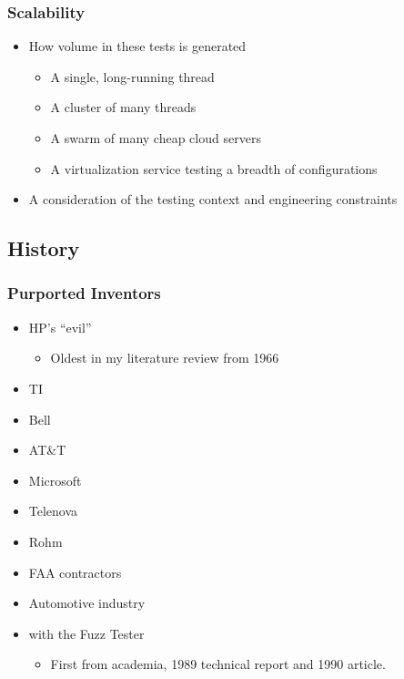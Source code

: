 \begin{frame}
  \frametitle{Scalability}
  \begin{itemize}
    \item How volume in these tests is generated
    \begin{itemize}
      \item A single, long-running thread
      \item A cluster of many threads
      \item A swarm of many cheap cloud servers \citep{parveen2010migrate}
      \item A virtualization service testing a breadth of configurations
    \end{itemize}
    \item A consideration of the testing context and engineering constraints
  \end{itemize}
\end{frame}

\subsection{History}

\begin{frame}
  \frametitle{Purported Inventors}
  \begin{itemize}
    \item HP's ``evil''
    \begin{itemize}
      \item Oldest in my literature review from 1966
    \end{itemize}
    \item TI
    \item Bell
    \item AT\&T
    \item Microsoft
    \item Telenova
    \item Rohm
    \item FAA contractors
    \item Automotive industry
    \item \citet{miller1989TR830} with the Fuzz Tester
    \begin{itemize}
      \item First from academia, 1989 technical report and 1990 article.
    \end{itemize}
  \end{itemize}
\end{frame}

